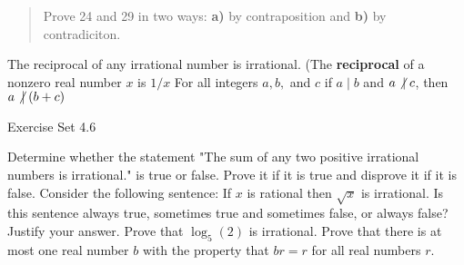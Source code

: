 \documentclass[12pt,letterpaper, onecolumn]{exam}
\newcommand{\doesnotdivide}{\not\hspace{2.5pt}\mid}
\begin{document}
\begin{questions}
\begin{questions}
			\begin{quote}
				Prove 24 and 29 in two ways: \textbf{a)} by contraposition and \textbf{b)} by contradiciton.
			\end{quote}
			\setcounter{question}{23}\question The reciprocal of any irrational number is irrational. (The \textbf{reciprocal} of a nonzero real number $x$ is $1/x$
			\setcounter{question}{28}\question For all integers $a, b,$ and $c$ if $a\mid b$ and $a\doesnotdivide c$, then $a\doesnotdivide (b+c)$
		\end{questions}
		\centering\large Exercise Set 4.6
		\begin{questions}
			\setcounter{question}{10}\question Determine whether the statement "The sum of any two positive irrational numbers is irrational." is true or false. Prove it if it is true and disprove it if it is false.
			\setcounter{question}{13}\question Consider the following sentence: If $x$ is rational then $\sqrt{x}$ is irrational. Is this sentence always true, sometimes true and sometimes false, or always false? Justify your answer.
			\setcounter{question}{23}\question Prove that $\log_5 (2)$ is irrational.
			\setcounter{question}{34}\question Prove that there is at most one real number $b$ with the property that $br =r$ for all real numbers $r$.
		\end{questions}
		
		
	\end{questions}
\end{document}
